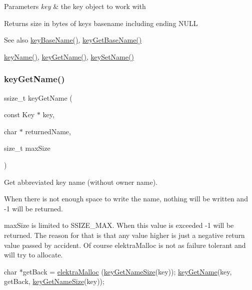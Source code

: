 \begin{DoxyParams}{Parameters}
{\em key} & the key object to work with \\
\hline
\end{DoxyParams}
\begin{DoxyReturn}{Returns}
size in bytes of {\ttfamily key\textquotesingle{}s} basename including ending N\+U\+LL 
\end{DoxyReturn}
\begin{DoxySeeAlso}{See also}
\hyperlink{group__keyname_gaaff35e7ca8af5560c47e662ceb9465f5}{key\+Base\+Name()}, \hyperlink{group__keyname_ga0992d26bcfca767cb8e77053a483eb64}{key\+Get\+Base\+Name()} 

\hyperlink{group__keyname_ga8e805c726a60da921d3736cda7813513}{key\+Name()}, \hyperlink{group__keyname_gab29a850168d9b31c9529e90cf9ab68be}{key\+Get\+Name()}, \hyperlink{group__keyname_ga7699091610e7f3f43d2949514a4b35d9}{key\+Set\+Name()} 
\end{DoxySeeAlso}
\mbox{\label{group__keyname_gab29a850168d9b31c9529e90cf9ab68be}} 
\subsubsection{\texorpdfstring{key\+Get\+Name()}{keyGetName()}}
{\footnotesize\ttfamily ssize\+\_\+t key\+Get\+Name (\begin{DoxyParamCaption}\item[{const Key $\ast$}]{key,  }\item[{char $\ast$}]{returned\+Name,  }\item[{size\+\_\+t}]{max\+Size }\end{DoxyParamCaption})}



Get abbreviated key name (without owner name). 

When there is not enough space to write the name, nothing will be written and -\/1 will be returned.

max\+Size is limited to S\+S\+I\+Z\+E\+\_\+\+M\+AX. When this value is exceeded -\/1 will be returned. The reason for that is that any value higher is just a negative return value passed by accident. Of course elektra\+Malloc is not as failure tolerant and will try to allocate.


\begin{DoxyCode}
\textcolor{keywordtype}{char} *getBack = \hyperlink{internal_8c_a35cdc2e5caed3454cb73b4fc7f37858c}{elektraMalloc} (\hyperlink{group__keyname_gabdbcfa51ed8a387e47ead207affa2d2e}{keyGetNameSize}(key));
\hyperlink{group__keyname_gab29a850168d9b31c9529e90cf9ab68be}{keyGetName}(key, getBack, \hyperlink{group__keyname_gabdbcfa51ed8a387e47ead207affa2d2e}{keyGetNameSize}(key));
\end{DoxyCode}


